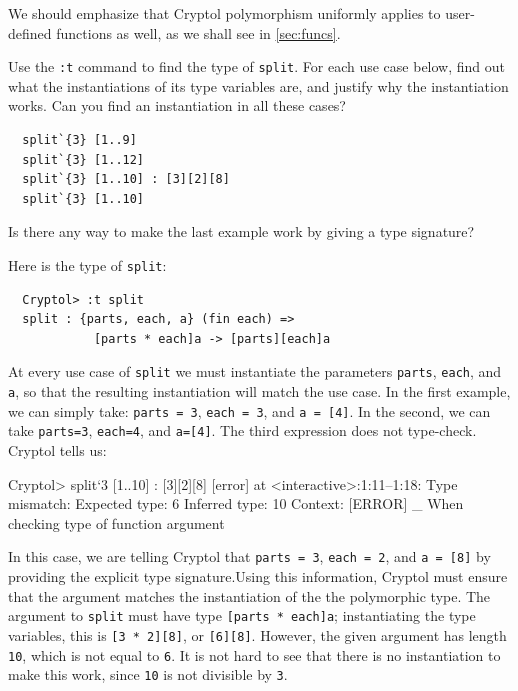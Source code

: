 We should emphasize that Cryptol polymorphism\indPolymorphism
uniformly applies to user-defined functions as well, as we shall see
in \autoref{sec:funcs}.

\begin{Exercise}\label{ex:poly:split}\indGroup
  Use the \texttt{:t} command to find the type of \texttt{split}. For
  each use case below, find out what the instantiations of its type
  variables are, and justify why the instantiation works. Can you find
  an instantiation in all these cases?
\begin{Verbatim}
  split`{3} [1..9]
  split`{3} [1..12]
  split`{3} [1..10] : [3][2][8]
  split`{3} [1..10]
\end{Verbatim}
Is there any way to make the last example work by giving a type signature?
\end{Exercise}
\begin{Answer}\indGroup
Here is the type of \texttt{split}:
\begin{Verbatim}
  Cryptol> :t split
  split : {parts, each, a} (fin each) =>
            [parts * each]a -> [parts][each]a
\end{Verbatim}
At every use case of \texttt{split} we must instantiate the parameters
\texttt{parts}, \texttt{each}, and \texttt{a}, so that the resulting
instantiation will match the use case. In the first example, we can
simply take: \texttt{parts = 3}, \texttt{each = 3}, and \texttt{a = [4]}. In
the second, we can take \texttt{parts=3}, \texttt{each=4}, and
\texttt{a=[4]}. The third expression does not type-check. Cryptol
tells us:
\restartrepl
\begin{replPrompt}
  Cryptol> split`{3} [1..10] : [3][2][8]
  [error] at <interactive>:1:11--1:18:
    Type mismatch:
      Expected type: 6
      Inferred type: 10
      Context: [ERROR] _
      When checking type of function argument
\end{replPrompt}
In this case, we are telling Cryptol that \texttt{parts = 3},
\texttt{each = 2}, and \texttt{a = [8]} by providing the explicit type
signature.\indSignature Using this information, Cryptol must ensure
that the argument matches the instantiation of the the polymorphic
type. The argument to \texttt{split} must have type \texttt{[parts *
    each]a}; instantiating the type variables, this is \texttt{[3 *
    2][8]}, or \texttt{[6][8]}. However, the given argument has length
\texttt{10}, which is not equal to \texttt{6}. It is not hard to see
that there is no instantiation to make this work, since \texttt{10} is
not divisible by \texttt{3}.
\end{Answer}

